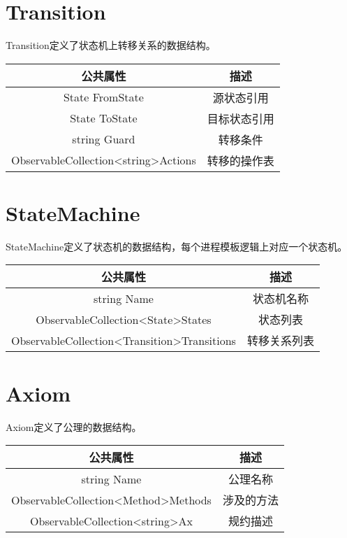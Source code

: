 \section{Transition}
Transition定义了状态机上转移关系的数据结构。
\begin{table}[h]
	\centering
	\begin{tabular}{|c|c|}
		\hline
		\textbf{公共属性}                                             & \textbf{描述} \\ \hline
		State FromState                                           & 源状态引用       \\ \hline
		State ToState                                             & 目标状态引用      \\ \hline
		string Guard                                              & 转移条件        \\ \hline
		ObservableCollection\textless{}string\textgreater Actions & 转移的操作表      \\ \hline
	\end{tabular}
\end{table}

\section{StateMachine}
StateMachine定义了状态机的数据结构，每个进程模板逻辑上对应一个状态机。
\begin{table}[h]
	\centering
	\begin{tabular}{|c|c|}
		\hline
		\textbf{公共属性}                                                     & \textbf{描述} \\ \hline
		string Name                                                       & 状态机名称       \\ \hline
		ObservableCollection\textless{}State\textgreater States           & 状态列表        \\ \hline
		ObservableCollection\textless{}Transition\textgreater Transitions & 转移关系列表      \\ \hline
	\end{tabular}
\end{table}

\section{Axiom}
Axiom定义了公理的数据结构。
\begin{table}[h]
	\centering
	\begin{tabular}{|c|c|}
		\hline
		\textbf{公共属性}                                             & \textbf{描述} \\ \hline
		string Name                                               & 公理名称        \\ \hline
		ObservableCollection\textless{}Method\textgreater Methods & 涉及的方法       \\ \hline
		ObservableCollection\textless{}string\textgreater Ax      & 规约描述        \\ \hline
	\end{tabular}
\end{table}

